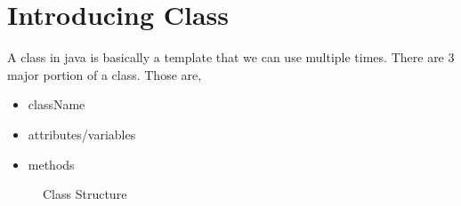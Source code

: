 \documentclass[openany]{book}  %
\begin{document}
\section{Introducing Class}
A class in java is basically a template that we can use multiple
times. There are 3 major portion of a class. Those are,
\begin{itemize}
    \item className
    \item attributes/variables
    \item methods
\end{itemize}
% 
% 
\begin{figure}[htbp]
    \begin{center}
        \caption{Class Structure}
    \end{center}
\end{figure}
\end{document}
